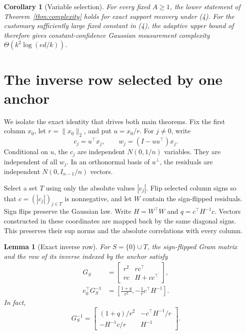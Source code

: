 \documentclass[twoside]{article}
\newtheorem{lemma}[theorem]{Lemma}
\newtheorem{corollary}[theorem]{Corollary}
\begin{document}
\begin{corollary}[Variable selection]
\label{cor:selection}
For every fixed $A\geq1$, the lower statement of Theorem~\ref{thm:complexity} holds for exact support recovery under (4). For the customary sufficiently large fixed constant in (4), the adaptive upper bound of \citet{chen2026adaptive} therefore gives constant-confidence Gaussian measurement complexity $\Theta(k^2\log(ed/k))$.
\end{corollary}

\section{The inverse row selected by one anchor}
\label{sec:inverse}

We isolate the exact identity that drives both main theorems. Fix the first column $x_0$, let $r=\|x_0\|_2$, and put $u=x_0/r$. For $j\neq0$, write \[ c_j=u^\top x_j, \qquad w_j=(I-uu^\top)x_j. \tag{5} \] Conditional on $u$, the $c_j$ are independent $N(0,1/n)$ variables. They are independent of all $w_j$. In an orthonormal basis of $u^\perp$, the residuals are independent $N(0,I_{n-1}/n)$ vectors.

Select a set $T$ using only the absolute values $|c_j|$. Flip selected column signs so that $c=(|c_j|)_{j\in T}$ is nonnegative, and let $W$ contain the sign-flipped residuals. Sign flips preserve the Gaussian law. Write $H=W^\top W$ and $q=c^\top H^{-1}c$. Vectors constructed in these coordinates are mapped back by the same diagonal signs. This preserves their sup norms and the absolute correlations with every column.

\begin{lemma}[Exact inverse row]
\label{lem:block}
For $S=\{0\}\cup T$, the sign-flipped Gram matrix and the row of its inverse indexed by the anchor satisfy
\begin{align}
 G_S&=
 \begin{bmatrix}
 r^2&r c^\top\\
 r c&H+cc^\top
 \end{bmatrix},
 \tag{6}\\
 e_0^\top G_S^{-1}
 &=\left[\frac{1+q}{r^2},-\frac1r c^\top H^{-1}\right].
 \tag{7}
\end{align}
In fact, \[ G_S^{-1}=
 \begin{bmatrix}
 (1+q)/r^2&-c^\top H^{-1}/r\\
 -H^{-1}c/r&H^{-1}
 \end{bmatrix}.
\tag{8} \]
\end{lemma}
\end{document}
